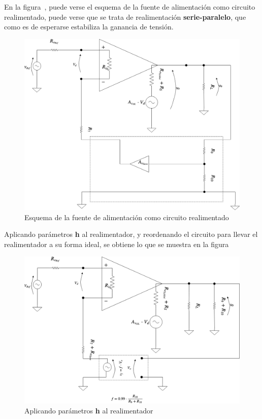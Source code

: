 \label{section:voltage_loop_justification}


En la figura~, puede verse el esquema de la fuente de alimentación como circuito realimentado, puede verse que se trata de realimentación \textbf{serie-paralelo}, que como es de esperarse estabiliza la ganancia de tensión.

\begin{figure}[H] %
\begin{center}
\includegraphics[width=0.9 \textwidth, angle=0]{./img/voltage_loop/VOLTAGE_LOOP_1.png}
\caption{\label{fig:fig_voltage_loop_1}\footnotesize{Esquema de la fuente de alimentación como circuito realimentado}}
\end{center}
\end{figure}

Aplicando parámetros \textbf{h} al realimentador, y reordenando el circuito para llevar el realimentador a su forma ideal, se obtiene lo que se muestra en la figura~


\begin{figure}[H] %
\begin{center}
\includegraphics[width=0.9 \textwidth, angle=0]{./img/voltage_loop/VOLTAGE_LOOP_2.png}
\caption{\label{fig:fig_voltage_loop_2}\footnotesize{Aplicando parámetros \textbf{h} al realimentador}}
\end{center}
\end{figure}

